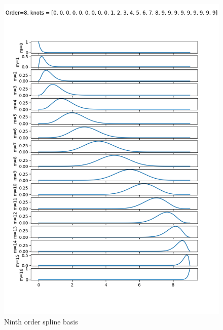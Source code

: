 \begin{figure}[ht]
  \includegraphics[width=\linewidth]{./chap5_trajectory_planning/figures/spline_basis_8}
  \caption{Ninth order spline basis}
  \label{fig:spline_basis_8}  
\end{figure}

\clearpage

\par{}

